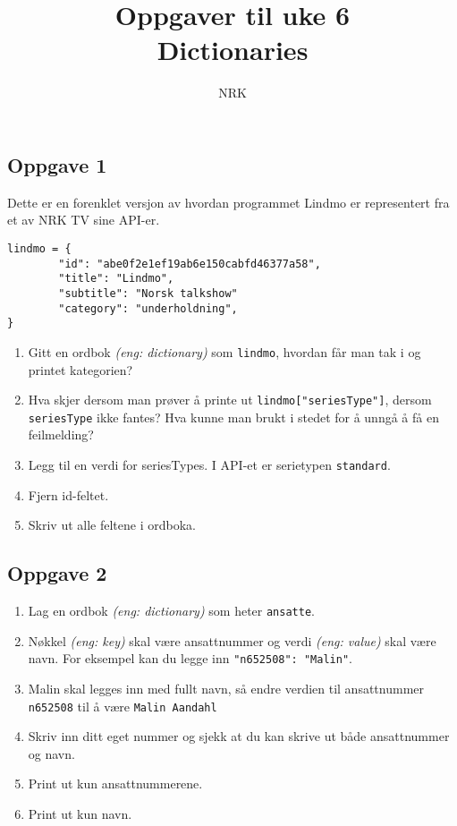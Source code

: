 \documentclass{article}
\title{Oppgaver til uke 6 \\ Dictionaries}
\author{NRK}
\date{}
\begin{document}
\maketitle
\noindent

\subsection*{Oppgave 1}
Dette er en forenklet versjon av hvordan programmet Lindmo er representert fra et av NRK TV sine API-er.
\begin{verbatim}
lindmo = {
	    "id": "abe0f2e1ef19ab6e150cabfd46377a58",
	    "title": "Lindmo",
	    "subtitle": "Norsk talkshow"
	    "category": "underholdning",
}
\end{verbatim}

\begin{enumerate}
\item Gitt en ordbok \textit{(eng: dictionary)} som \texttt{lindmo}, hvordan får man tak i og printet kategorien?
\item Hva skjer dersom man prøver å printe ut \texttt{lindmo["seriesType"]}, dersom \texttt{seriesType} ikke fantes? Hva kunne man brukt i stedet for å unngå å få en feilmelding?
\item Legg til en verdi for seriesTypes. I API-et er serietypen \texttt{standard}.
\item Fjern id-feltet.
\item Skriv ut alle feltene i ordboka.
\end{enumerate}

\subsection*{Oppgave 2}

\begin{enumerate}
\item Lag en ordbok \textit{(eng: dictionary)} som heter \texttt{ansatte}.
\item Nøkkel \textit{(eng: key)} skal være ansattnummer og verdi \textit{(eng: value)} skal være navn. For eksempel kan du legge inn \texttt{"n652508": "Malin"}.
\item Malin skal legges inn med fullt navn, så endre verdien til ansattnummer \texttt{n652508} til å være \texttt{Malin Aandahl}
\item Skriv inn ditt eget nummer og sjekk at du kan skrive ut både ansattnummer og navn.
\item Print ut kun ansattnummerene.
\item Print ut kun navn.
\end{enumerate}
\end{document}
